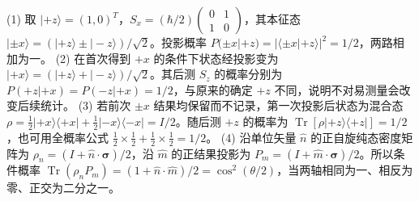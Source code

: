 (1) 取 \(|+z\rangle=(1,0)^T\)，\(S_x=(\hbar/2)\begin{pmatrix}0&1\\1&0\end{pmatrix}\)，其本征态 \(|\pm x\rangle=(|+z\rangle\pm|-z\rangle)/\sqrt2\)。投影概率 \(P(\pm x|+z)=|\langle\pm x|+z\rangle|^2=1/2\)，两路相加为一。
(2) 在首次得到 \(+x\) 的条件下状态经投影变为 \(|+x\rangle=(|+z\rangle+|-z\rangle)/\sqrt2\)。其后测 \(S_z\) 的概率分别为 \(P(+z|+x)=P(-z|+x)=1/2\)，与原来的确定 \(+z\) 不同，说明不对易测量会改变后续统计。
(3) 若前次 \(\pm x\) 结果均保留而不记录，第一次投影后状态为混合态 \(\rho=\frac12|+x\rangle\langle+x|+\frac12|-x\rangle\langle-x|=I/2\)。随后测 \(+z\) 的概率为 \(\operatorname{Tr}[\rho|+z\rangle\langle+z|]=1/2\)，也可用全概率公式 \(\frac12\times\frac12+\frac12\times\frac12=1/2\)。
(4) 沿单位矢量 \(\hat n\) 的正自旋纯态密度矩阵为 \(\rho_n=(I+\hat n\cdot\boldsymbol\sigma)/2\)，沿 \(\hat m\) 的正结果投影为 \(P_m=(I+\hat m\cdot\boldsymbol\sigma)/2\)。所以条件概率 \(\operatorname{Tr}(\rho_nP_m)=(1+\hat n\cdot\hat m)/2=\cos^2(\theta/2)\)，当两轴相同为一、相反为零、正交为二分之一。
